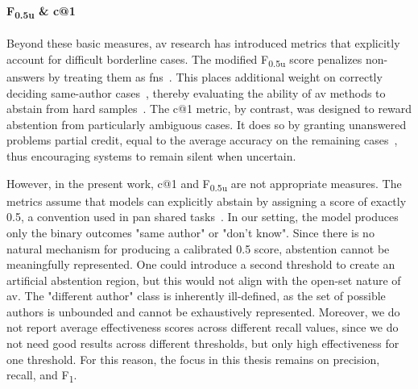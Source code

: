 \paragraph{F\textsubscript{0.5u} \& c@1}
Beyond these basic measures, \ac{av} research has introduced metrics that explicitly account for difficult borderline cases. 
The modified F\textsubscript{0.5u} score penalizes non-answers by treating them as \acp{fn}~\citep{bevendorff_overview_2024}. 
This places additional weight on correctly deciding same-author cases~\citep{weerasinghe_feature_vector_difference_2021}, thereby evaluating the ability of \ac{av} methods to abstain from hard samples~\citep{tyo_state_2022}. 
The c@1 metric, by contrast, was designed to reward abstention from particularly ambiguous cases. 
It does so by granting unanswered problems partial credit, equal to the average accuracy on the remaining cases~\citep{bevendorff_overview_2024}, thus encouraging systems to remain silent when uncertain.

However, in the present work, c@1 and F\textsubscript{0.5u} are not appropriate measures. 
The metrics assume that models can explicitly abstain by assigning a score of exactly 0.5, a convention used in \ac{pan} shared tasks~\citep{tyo_state_2022,bevendorff_overview_2024,kocher_unine_2015}. 
In our setting, the model produces only the binary outcomes "same author" or "don't know". 
Since there is no natural mechanism for producing a calibrated 0.5 score, abstention cannot be meaningfully represented. 
One could introduce a second threshold to create an artificial abstention region, but this would not align with the open-set nature of \ac{av}. 
The "different author" class is inherently ill-defined, as the set of possible authors is unbounded and cannot be exhaustively represented. 
Moreover, we do not report average effectiveness scores across different recall values, since we do not need good results across different thresholds, but only high effectiveness for one threshold.
For this reason, the focus in this thesis remains on precision, recall, and F\textsubscript{1}. 
